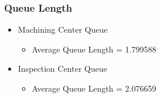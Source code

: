 \documentclass[aps,letterpaper,10pt]{revtex4}
\begin{document}
        \newpage
        \subsubsection{Queue Length}
            \begin{itemize}
                \item Machining Center Queue
                    \begin{itemize}
                        \item Average Queue Length = 1.799588
                    \end{itemize}
                    \begin{figure}[htp]
                        \begin{center}
                        \end{center}
                    \end{figure}
                \item Inspection Center Queue
                    \begin{itemize}
                        \item Average Queue Length = 2.076659
                    \end{itemize}
                    \begin{figure}[htp]
                        \begin{center}
\end{center}
\end{figure}
\end{itemize}
\end{document}
